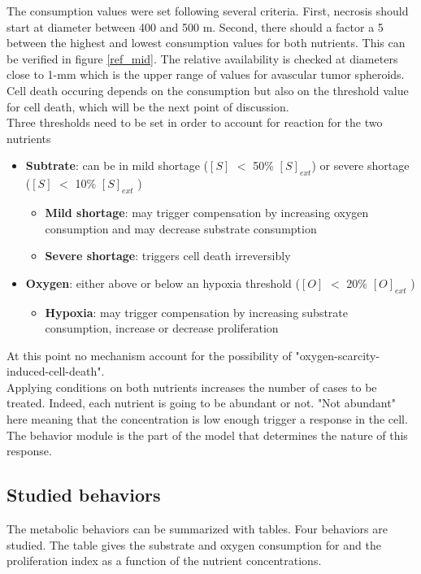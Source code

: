 \documentclass[11pt,a4paper]{article}
\begin{document}
The consumption values were set following several criteria. First, necrosis should start at diameter between 400 and 500 \textmu m\cite{Freyer1986}\cite{Freyer1988}. Second, there should a factor a 5 between the highest and lowest consumption values for both nutrients.\cite{Kammerer2015} This can be verified in figure \ref{ref_mid}. The relative availability is checked at diameters close to 1-mm which is the upper range of values for avascular tumor spheroids.\cite{Freyer1986}\cite{MullerKlieser1986} Cell death occuring depends on the consumption but also on the threshold value for cell death, which will be the next point of discussion.\\

Three thresholds need to be set in order to account for reaction for the two nutrients
\begin{itemize}
\item \textbf{Subtrate}: can be in mild shortage ($[S]$  $<$ 50\% $[S]_{ext}$) or severe shortage ($[S]$  $<$ 10\% $[S]_{ext}$  )

\begin{itemize}
\item \textbf{Mild shortage}: may trigger compensation by increasing oxygen consumption and may decrease substrate consumption
\item \textbf{Severe shortage}: triggers cell death irreversibly
\end{itemize}

\item  \textbf{Oxygen}: either above or below an hypoxia threshold ($[O]$  $<$ 20\% $[O]_{ext}$ )
\begin{itemize}
\item \textbf{Hypoxia}: may trigger compensation by increasing substrate consumption, increase or decrease proliferation
\end{itemize}
\end{itemize}

At this point no mechanism account for the possibility of "oxygen-scarcity-induced-cell-death".\\


Applying conditions on both nutrients increases the number of cases to be treated. Indeed, each nutrient is going to be abundant or not.  "Not abundant" here meaning that the concentration is low enough trigger a response in the cell. The behavior module is the part of the model that determines the nature of this response.\\

\subsection{Studied behaviors}
The metabolic behaviors can be summarized with tables. Four behaviors are studied. The table gives the substrate and oxygen consumption for  and the proliferation index as a function of the nutrient concentrations.\\
\end{document}
